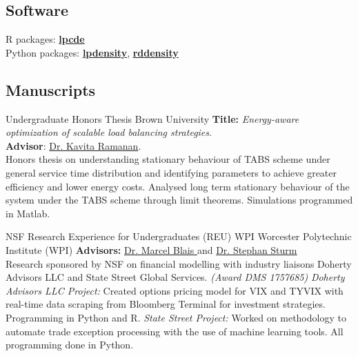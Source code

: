 \documentclass[10pt,a4paper,roman]{moderncv}        %
\begin{document}

\subsection{Software}
R packages:
\color{blue}\href{https://nppackages.github.io/lpcde/}{\textbf{lpcde}}\color{black}
\\
Python packages: \color{blue}\href{https://nppackages.github.io/lpdensity_doc/}
{\textbf{lpdensity}}\color{black},
\color{blue}\href{https://rdpackages.github.io/rddensity_doc/}
{\textbf{rddensity}}\color{black}

\subsection{Manuscripts}
{Undergraduate Honors Thesis}
{Brown University}{}
{\textbf{Title:} \textit{Energy-aware optimization of scalable load balancing strategies}.\\
  \textbf{Advisor}: \color{blue}\href{https://www.brown.edu/academics/applied-mathematics/faculty/kavita-ramanan/home}
{Dr. Kavita Ramanan}\color{black}.\\
Honors thesis on understanding stationary behaviour of TABS scheme
under general service time distribution and identifying parameters
to achieve greater efficiency and lower energy costs.
Analysed long term stationary behaviour of the system under the TABS scheme
through limit theorems.
Simulations programmed in Matlab.}

{NSF Research Experience for Undergraduates (REU) }
{WPI}
{Worcester Polytechnic Institute (WPI)}
{\textbf{Advisors:}
  \color{blue}\href{https://www.wpi.edu/people/faculty/myblais}{Dr. Marcel Blais
  }\color{black}
  and \color{blue}\href{https://www.wpi.edu/people/faculty/ssturm}{Dr. Stephan Sturm
  }\color{black}
  \\
  Research sponsored by NSF on financial modelling
  with industry liaisons Doherty Advisors LLC and State Street Global Services.
  \textit{(Award DMS 1757685)}
  \newline{}%
\textit{Doherty Advisors LLC Project:}
Created options pricing model for VIX and TYVIX with real-time data scraping
from Bloomberg Terminal for investment strategies.
Programming in Python and R.
\newline{}
\textit{State Street Project:}
Worked on methodology to automate trade exception processing with the use of
machine learning tools. All programming done in Python.
}
\end{document}
